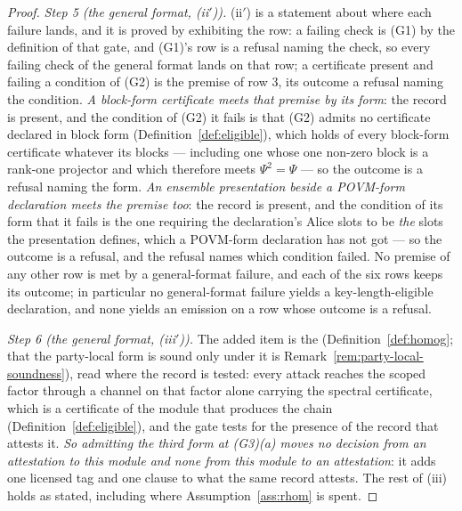 \begin{proof}
\emph{Step 5 (the general format, (ii$'$)).} (ii$'$) is a statement about
where each failure lands, and it is proved by exhibiting the row: a failing
check is (G1) by the definition of that gate, and (G1)'s row is a refusal
naming the check, so every failing check of the general format lands on that
row; a certificate present and failing a condition of (G2) is the premise of
row 3, its outcome a refusal naming the condition. \emph{A block-form
certificate meets that premise by its form}: the record is present, and the
condition of (G2) it fails is that (G2) admits no certificate declared in
block form (Definition~\ref{def:eligible}), which holds of every block-form
certificate whatever its blocks --- including one whose one non-zero block is
a rank-one projector and which therefore meets $\Psi^2=\Psi$ --- so the
outcome is a refusal naming the form. \emph{An ensemble presentation
beside a POVM-form declaration meets the premise too}: the record is present,
and the condition of its form that it fails is the one requiring the
declaration's Alice slots to be \emph{the} slots the presentation defines,
which a POVM-form declaration has not got --- so the outcome is a refusal, and
the refusal names which condition failed. No premise of any other row is met
by a general-format failure, and each of the six rows keeps its outcome; in
particular no general-format failure yields a key-length-eligible
declaration, and none yields an emission on a row whose outcome is a refusal.

\emph{Step 6 (the general format, (iii$'$)).} The added item is the
 (Definition~\ref{def:homog};
that the party-local form is sound only under it is
Remark~\ref{rem:party-local-soundness}), read where the record is tested:
every attack reaches the scoped factor through a channel on that factor alone
carrying the spectral certificate, which is a certificate of the module that
produces the chain (Definition~\ref{def:eligible}), and the gate tests for
the presence of the record that attests it. \emph{So admitting the third form
at (G3)(a) moves no decision from an attestation to this module and none from
this module to an attestation}: it adds one licensed tag and one clause to
what the same record attests. The rest of (iii) holds as stated, including
where Assumption~\ref{ass:rhom} is spent.
\end{proof}
